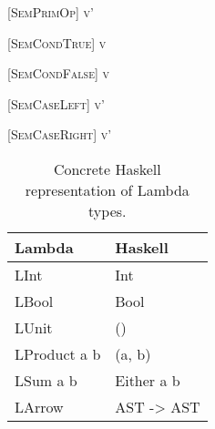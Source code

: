 \begin{prooftree*}
  [\scshape SemPrimOp]{ \Downarrow v'}
\end{prooftree*}

\begin{prooftree*}
  [\scshape SemCondTrue]{ \Downarrow v}
\end{prooftree*}

\begin{prooftree*}
  [\scshape SemCondFalse]{ \Downarrow v}
\end{prooftree*}

\begin{prooftree*}
  [\scshape SemCaseLeft]{ \Downarrow v'}
\end{prooftree*}

\begin{prooftree*}
  [\scshape SemCaseRight]{ \Downarrow v'}
\end{prooftree*}

\begin{table}[ht]
  \centering
  \begin{tabular}[t]{ll}
    Lambda      & Haskell    \\
    \midrule
    LInt         & Int        \\
    LBool        & Bool       \\
    LUnit        & ()         \\
    LProduct a b & (a, b)     \\
    LSum a b     & Either a b \\
    LArrow       & AST -> AST \\
  \end{tabular}
  \caption{Concrete Haskell representation of Lambda types.}
\end{table}
